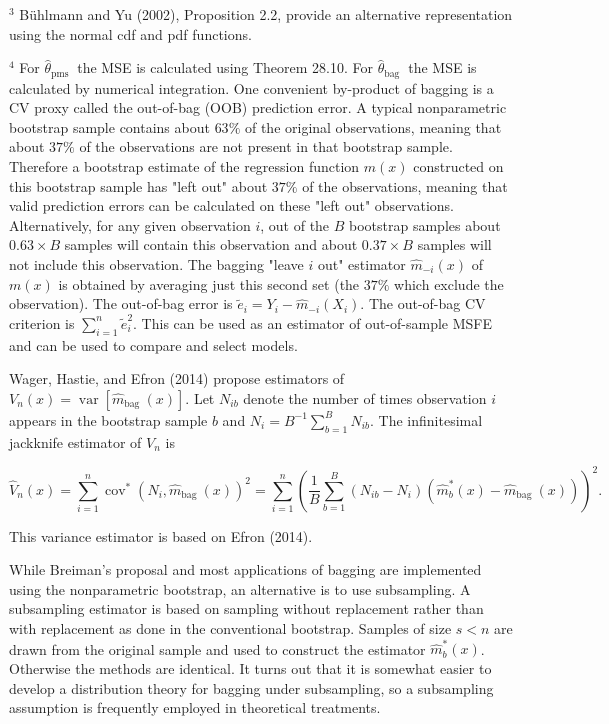 \documentclass[10pt]{article}
\begin{document}
${ }^{3}$ Bühlmann and Yu (2002), Proposition 2.2, provide an alternative representation using the normal cdf and pdf functions.

${ }^{4}$ For $\widehat{\theta}_{\text {pms }}$ the MSE is calculated using Theorem 28.10. For $\widehat{\theta}_{\text {bag }}$ the MSE is calculated by numerical integration. One convenient by-product of bagging is a CV proxy called the out-of-bag (OOB) prediction error. A typical nonparametric bootstrap sample contains about $63 \%$ of the original observations, meaning that about $37 \%$ of the observations are not present in that bootstrap sample. Therefore a bootstrap estimate of the regression function $m(x)$ constructed on this bootstrap sample has "left out" about $37 \%$ of the observations, meaning that valid prediction errors can be calculated on these "left out" observations. Alternatively, for any given observation $i$, out of the $B$ bootstrap samples about $0.63 \times B$ samples will contain this observation and about $0.37 \times B$ samples will not include this observation. The bagging "leave $i$ out" estimator $\widehat{m}_{-i}(x)$ of $m(x)$ is obtained by averaging just this second set (the $37 \%$ which exclude the observation). The out-of-bag error is $\widetilde{e}_{i}=Y_{i}-\widehat{m}_{-i}\left(X_{i}\right)$. The out-of-bag CV criterion is $\sum_{i=1}^{n} \widetilde{e}_{i}^{2}$. This can be used as an estimator of out-of-sample MSFE and can be used to compare and select models.

Wager, Hastie, and Efron (2014) propose estimators of $V_{n}(x)=\operatorname{var}\left[\widehat{m}_{\text {bag }}(x)\right]$. Let $N_{i b}$ denote the number of times observation $i$ appears in the bootstrap sample $b$ and $N_{i}=B^{-1} \sum_{b=1}^{B} N_{i b}$. The infinitesimal jackknife estimator of $V_{n}$ is

$$
\widehat{V}_{n}(x)=\sum_{i=1}^{n} \operatorname{cov}^{*}\left(N_{i}, \widehat{m}_{\text {bag }}(x)\right)^{2}=\sum_{i=1}^{n}\left(\frac{1}{B} \sum_{b=1}^{B}\left(N_{i b}-N_{i}\right)\left(\widehat{m}_{b}^{*}(x)-\widehat{m}_{\text {bag }}(x)\right)\right)^{2} .
$$

This variance estimator is based on Efron (2014).

While Breiman's proposal and most applications of bagging are implemented using the nonparametric bootstrap, an alternative is to use subsampling. A subsampling estimator is based on sampling without replacement rather than with replacement as done in the conventional bootstrap. Samples of size $s<n$ are drawn from the original sample and used to construct the estimator $\widehat{m}_{b}^{*}(x)$. Otherwise the methods are identical. It turns out that it is somewhat easier to develop a distribution theory for bagging under subsampling, so a subsampling assumption is frequently employed in theoretical treatments.
\end{document}
